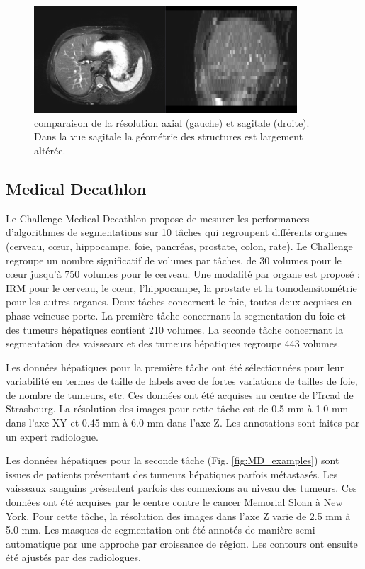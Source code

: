 \begin{figure}
    \centering
    \includegraphics[height=4cm]{Images/CHAOS_resolution.png}
    \caption{comparaison de la résolution axial (gauche) et sagitale (droite). Dans la vue sagitale la géométrie des structures est largement altérée.}
    \label{fig:CHAOS_geometry}
\end{figure}

\subsection{Medical Decathlon}

Le Challenge Medical Decathlon propose de mesurer les performances d'algorithmes de segmentations sur 10 tâches qui regroupent différents organes (cerveau, cœur, hippocampe, foie, pancréas, prostate, colon, rate). Le Challenge regroupe un nombre significatif de volumes par tâches, de 30 volumes pour le cœur jusqu'à 750 volumes pour le cerveau. Une modalité par organe est proposé : IRM pour le cerveau, le cœur, l'hippocampe, la prostate et la tomodensitométrie pour les autres organes. Deux tâches concernent le foie, toutes deux acquises en phase veineuse porte. La première tâche concernant la segmentation du foie et des tumeurs hépatiques contient 210 volumes. La seconde tâche concernant la segmentation des vaisseaux et des tumeurs hépatiques regroupe 443 volumes.

Les données hépatiques pour la première tâche ont été sélectionnées pour leur variabilité en termes de taille de labels avec de fortes variations de tailles de foie, de nombre de tumeurs, etc. Ces données ont été acquises au centre de l'Ircad de Strasbourg. La résolution des images pour cette tâche est de 0.5 mm à 1.0 mm dans l'axe XY et 0.45 mm à 6.0 mm dans l'axe Z. Les annotations sont faites par un expert radiologue.

Les données hépatiques pour la seconde tâche (Fig. \ref{fig:MD_examples}) sont issues de patients présentant des tumeurs hépatiques parfois métastasés. Les vaisseaux sanguins présentent parfois des connexions au niveau des tumeurs. Ces données ont été acquises par le centre contre le cancer Memorial Sloan à New York. Pour cette tâche, la résolution des images dans l'axe Z varie de 2.5 mm à 5.0 mm. Les masques de segmentation ont été annotés de manière semi-automatique par une approche par croissance de région. Les contours ont ensuite été ajustés par des radiologues.

